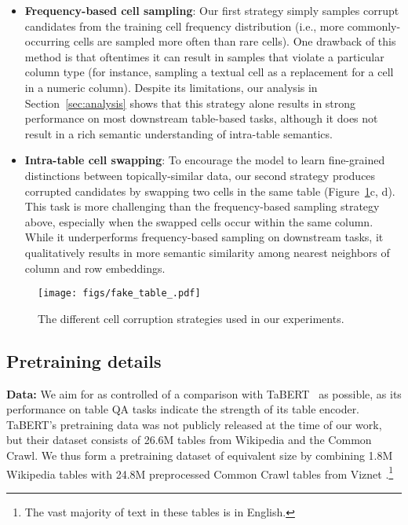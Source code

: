 \documentclass[11pt]{article}
\begin{document}
\begin{itemize} 
    \item \textbf{Frequency-based cell sampling}: Our first strategy simply samples corrupt candidates from the training cell frequency distribution (i.e., more commonly-occurring cells are sampled more often than rare cells). One drawback of this method is that oftentimes it can result in samples that violate a particular column type (for instance, sampling a textual cell as a replacement for a cell in a numeric column). Despite its limitations, our analysis in Section~\ref{sec:analysis} shows that this strategy alone results in strong performance on most downstream table-based tasks, although it does not result in a rich semantic understanding of intra-table semantics. 
    
    \item \textbf{Intra-table cell swapping}: To encourage the model to learn fine-grained distinctions between topically-similar data, our second strategy produces corrupted candidates by swapping two cells in the same table (Figure~\ref{fig:fake_tables}c, d). This task is more challenging than the frequency-based sampling strategy above, especially when the swapped cells occur within the same column. While it underperforms frequency-based sampling on downstream tasks, it qualitatively results in more semantic similarity among nearest neighbors of column and row embeddings.
\end{itemize}


\makeatother
\begin{figure}
\centering
\texttt{[image: figs/fake\_table\_.pdf]}
  \caption{The different cell corruption strategies used in our experiments.}
  \label{fig:fake_tables}
\end{figure}
 

\subsection{Pretraining details}

\noindent\textbf{Data:}
We aim for as controlled of a comparison with TaBERT~\citep{yin20acl} as possible, as its performance on table QA tasks indicate the strength of its table encoder. TaBERT's pretraining data was not publicly released at the time of our work, but their dataset consists of 26.6M tables from Wikipedia and the Common Crawl. We thus form a pretraining dataset of equivalent size by combining 1.8M Wikipedia tables with 24.8M preprocessed Common Crawl tables from Viznet \cite{DBLP:conf/chi/HuGHBZHK0SD19}.\footnote{The vast majority of text in these tables is in English.} 
\end{document}
